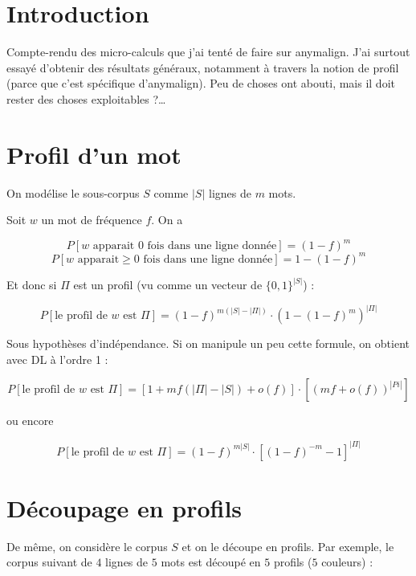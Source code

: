 \documentclass{article}
\begin{document}
\section{Introduction}
Compte-rendu des micro-calculs que j'ai tenté de faire sur anymalign. J'ai surtout essayé d'obtenir des résultats généraux, notamment à travers la notion de profil (parce que c'est spécifique d'anymalign). Peu de choses ont abouti, mais il doit rester des choses exploitables ?\dots

\section{Profil d'un mot}
On modélise le sous-corpus $S$ comme $|S|$ lignes de $m$ mots.

Soit $w$ un mot de fréquence $f$. On a

\begin{equation}
P[w \text{ apparait }0 \text{ fois dans une ligne donnée}] = (1-f)^m
\end{equation}
\begin{equation}
	P[w\text{ apparait}\geq0\text{ fois dans une ligne donnée}] = 1-(1-f)^m
\end{equation}

Et donc si $\Pi$ est un profil (vu comme un vecteur de $\{0,1\}^{|S|}$) : 

\begin{equation}
	P[\text{le profil de }w\text{ est }\Pi] = (1-f)^{m(|S|-|\Pi|)}\cdot(1-(1-f)^m)^{|\Pi|}
\end{equation}

Sous hypothèses d'indépendance. Si on manipule un peu cette formule, on obtient avec DL à l'ordre 1 :

\begin{equation}
	P[\text{le profil de }w\text{ est }\Pi] = [1+mf(|\Pi|-|S|)+o(f)]\cdot[(mf+o(f))^{|Pi|}]
\end{equation}

ou encore

\begin{equation}
	P[\text{le profil de }w\text{ est }\Pi] = (1-f)^{m|S|}\cdot[(1-f)^{-m}-1]^{|\Pi|}
\end{equation}


\section{Découpage en profils}
De m\^eme, on considère le corpus $S$ et on le découpe en profils.  Par exemple, le corpus suivant de $4$ lignes de $5$ mots est découpé en $5$ profils ($5$ couleurs) : \\
\end{document}

